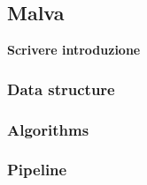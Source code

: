\documentclass[../main.tex]{subfiles}
\begin{document}
\subsection{Malva}
\label{malva}

\textbf{Scrivere introduzione}

\subsubsection{Data structure}
\subsubsection{Algorithms}
\subsubsection{Pipeline}
\end{document}
